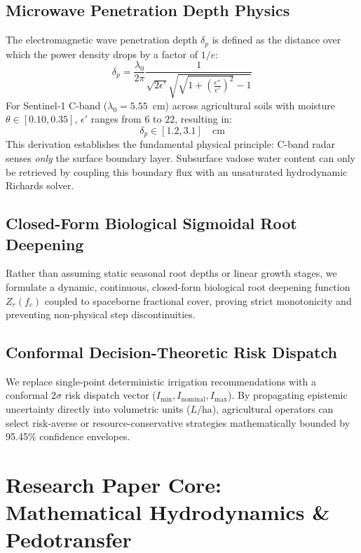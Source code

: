 \documentclass[11pt,a4paper]{article}
\theoremstyle{definition}
\theoremstyle{remark}
\begin{document}
\subsection{Microwave Penetration Depth Physics}
The electromagnetic wave penetration depth $\delta_p$ is defined as the distance over which the power density drops by a factor of $1/e$:
\begin{equation}
    \label{eq:penetration_depth}
    \delta_p = \frac{\lambda_0}{2\pi} \frac{1}{\sqrt{2 \epsilon'} \sqrt{\sqrt{1 + \left(\frac{\epsilon''}{\epsilon'}\right)^2} - 1}}
\end{equation}
For Sentinel-1 C-band ($\lambda_0 = 5.55$~cm) across agricultural soils with moisture $\theta \in [0.10, 0.35]$, $\epsilon'$ ranges from $6$ to $22$, resulting in:
\begin{equation}
    \delta_p \in [1.2, 3.1] \quad \text{cm}
\end{equation}
This derivation establishes the fundamental physical principle: C-band radar senses \textit{only} the surface boundary layer. Subsurface vadose water content can only be retrieved by coupling this boundary flux with an unsaturated hydrodynamic Richards solver.

\subsection{Closed-Form Biological Sigmoidal Root Deepening}
Rather than assuming static seasonal root depths or linear growth stages, we formulate a dynamic, continuous, closed-form biological root deepening function $Z_r(f_c)$ coupled to spaceborne fractional cover, proving strict monotonicity and preventing non-physical step discontinuities.

\subsection{Conformal Decision-Theoretic Risk Dispatch}
We replace single-point deterministic irrigation recommendations with a conformal $2\sigma$ risk dispatch vector ($I_{\min}, I_{\text{nominal}}, I_{\max}$). By propagating epistemic uncertainty directly into volumetric units ($L/\text{ha}$), agricultural operators can select risk-averse or resource-conservative strategies mathematically bounded by 95.45\% confidence envelopes.


\section{Research Paper Core: Mathematical Hydrodynamics \& Pedotransfer}
\end{document}
